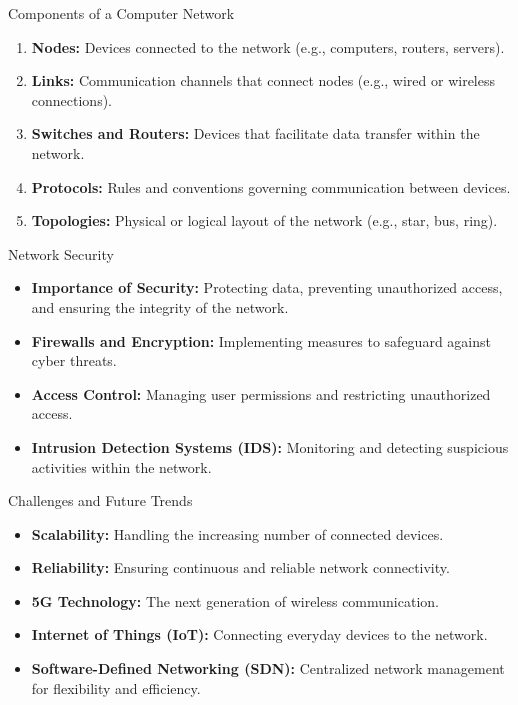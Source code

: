 \begin{frame}{Components of a Computer Network}
  \begin{enumerate}
    \item \textbf{Nodes:} Devices connected to the network (e.g., computers, routers, servers).
    \item \textbf{Links:} Communication channels that connect nodes (e.g., wired or wireless connections).
    \item \textbf{Switches and Routers:} Devices that facilitate data transfer within the network.
    \item \textbf{Protocols:} Rules and conventions governing communication between devices.
    \item \textbf{Topologies:} Physical or logical layout of the network (e.g., star, bus, ring).
  \end{enumerate}
\end{frame}

\begin{frame}{Network Security}
  \begin{itemize}
    \item \textbf{Importance of Security:} Protecting data, preventing unauthorized access, and ensuring the integrity of the network.
    \item \textbf{Firewalls and Encryption:} Implementing measures to safeguard against cyber threats.
    \item \textbf{Access Control:} Managing user permissions and restricting unauthorized access.
    \item \textbf{Intrusion Detection Systems (IDS):} Monitoring and detecting suspicious activities within the network.
  \end{itemize}
\end{frame}

\begin{frame}{Challenges and Future Trends}
  \begin{itemize}
    \item \textbf{Scalability:} Handling the increasing number of connected devices.
    \item \textbf{Reliability:} Ensuring continuous and reliable network connectivity.
    \item \textbf{5G Technology:} The next generation of wireless communication.
    \item \textbf{Internet of Things (IoT):} Connecting everyday devices to the network.
    \item \textbf{Software-Defined Networking (SDN):} Centralized network management for flexibility and efficiency.
  \end{itemize}
\end{frame}

